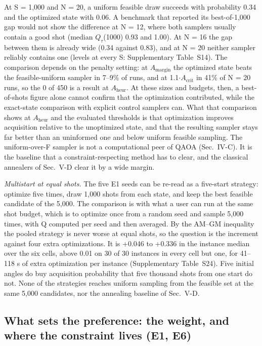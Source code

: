 \documentclass{ieeeaccess}
\begin{document}
At S = 1,000 and N = 20, a uniform feasible draw succeeds with probability 0.34 and the optimized state with 0.06. A benchmark that reported its best-of-1,000 gap would not show the difference at N = 12, where both samplers usually contain a good shot (median $Q_{\tau}$(1000) 0.93 and 1.00). At N = 16 the gap between them is already wide (0.34 against 0.83), and at N = 20 neither sampler reliably contains one (levels at every S: Supplementary Table~S14). The comparison depends on the penalty setting: at $A_{\mathrm{margin}}$ the optimized state beats the feasible-uniform sampler in 7--9\% of runs, and at 1.1$\cdot$$A_{\mathrm{crit}}$ in 41\% of N = 20 runs, so the 0 of 450 is a result at $A_{\mathrm{heur}}$. At these sizes and budgets, then, a best-of-shots figure alone cannot confirm that the optimization contributed, while the exact-state comparison with explicit control samplers can. What that comparison shows at $A_{\mathrm{heur}}$ and the evaluated thresholds is that optimization improves acquisition relative to the unoptimized state, and that the resulting sampler stays far better than an uninformed one and below uniform feasible sampling. The uniform-over-F sampler is not a computational peer of QAOA (Sec.~IV-C). It is the baseline that a constraint-respecting method has to clear, and the classical annealers of Sec.~V-D clear it by a wide margin.


\textit{Multistart at equal shots.} The five E1 seeds can be re-read as a five-start strategy: optimize five times, draw 1,000 shots from each state, and keep the best feasible candidate of the 5,000. The comparison is with what a user can run at the same shot budget, which is to optimize once from a random seed and sample 5,000 times, with Q computed per seed and then averaged. By the AM--GM inequality the pooled strategy is never worse at equal shots, so the question is the increment against four extra optimizations. It is +0.046 to +0.336 in the instance median over the six cells, above 0.01 on 30 of 30 instances in every cell but one, for 41--118 s of extra optimization per instance (Supplementary Table~S24). Five initial angles do buy acquisition probability that five thousand shots from one start do not. None of the strategies reaches uniform sampling from the feasible set at the same 5,000 candidates, nor the annealing baseline of Sec.~V-D.


\subsection{What sets the preference: the weight, and where the constraint lives (E1, E6)}
\end{document}
